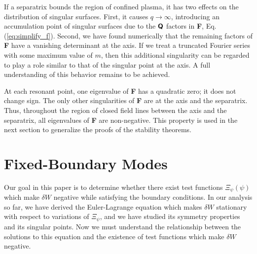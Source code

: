 \documentclass[prb,twocolumn,showpacs,preprintnumbers,amsmath,amssymb]{revtex4}
\renewcommand*{\t}[1]{\hbox{\sffamily\bfseries #1}}
\begin{document}
If a separatrix bounds the region of confined plasma, it has two effects
on the distribution of singular surfaces.  First, it causes $q \to
\infty$, introducing an accumulation point of singular surfaces due to
the $\t{Q}$ factors in \t{F}, Eq. (\ref{eq:simplify_f}).  Second, we
have found numerically that the remaining factors of \t{F} have a
vanishing determinant at the axis.  If we treat a truncated Fourier
series with some maximum value of $m$, then this additional singularity
can be regarded to play a role similar to that of the singular point at
the axis.  A full understanding of this behavior remains to be achieved.

At each resonant point, one eigenvalue of \t{F} has a quadratic zero; it
does not change sign.  The only other singularities of \t{F} are at the
axis and the separatrix.  Thus, throughout the region of closed field
lines between the axis and the separatrix, all eigenvalues of \t{F} are
non-negative.  This property is used in the next section to generalize
the proofs of the stability theorems.

\section{\label{sec:fixed}Fixed-Boundary Modes}

Our goal in this paper is to determine whether there exist test
functions $\Xi_\psi(\psi)$ which make $\delta W$ negative while
satisfying the boundary conditions.  In our analysis so far, we have
derived the Euler-Lagrange equation which makes $\delta W$ stationary
with respect to variations of $\Xi_\psi$, and we have studied its
symmetry properties and its singular points.  Now we must understand the
relationship between the solutions to this equation and the existence of
test functions which make $\delta W$ negative.
\end{document}
